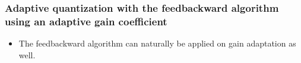 \documentclass[letterpaper,10pt,english]{jupyterBook}
\begin{document}
\sphinxAtStartPar
{}


\subsubsection{Adaptive quantization with the feed\sphinxhyphen{}backward algorithm using an adaptive gain coefficient}
\label{\detokenize{Representations/Waveform:adaptive-quantization-with-the-feed-backward-algorithm-using-an-adaptive-gain-coefficient}}\begin{itemize}
\item {} 
\sphinxAtStartPar
The feed\sphinxhyphen{}backward algorithm can naturally be applied on gain
adaptation as well.

\end{itemize}

\sphinxAtStartPar
{}
\end{document}
